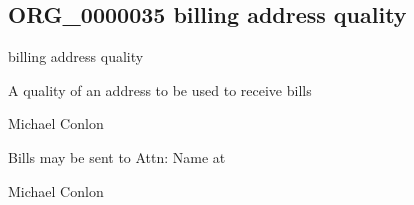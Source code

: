 \documentclass[letterpaper,10pt,english]{sphinxmanual}
\begin{document}
\subsection{ORG\_0000035 \sphinxhyphen{} billing address quality}
\label{\detokenize{doc-ORG_0000035:org-0000035-billing-address-quality}}\label{\detokenize{doc-ORG_0000035:index-0}}\label{\detokenize{doc-ORG_0000035::doc}}
\begin{sphinxShadowBox}

\sphinxAtStartPar
billing address quality
\end{sphinxShadowBox}

\begin{sphinxShadowBox}

\sphinxAtStartPar
{\hyperref[\detokenize{doc-BFO_0000019::doc}]{}}
\end{sphinxShadowBox}

\begin{sphinxShadowBox}

\sphinxAtStartPar
A quality of an address to be used to receive bills
\end{sphinxShadowBox}

\begin{sphinxShadowBox}

\sphinxAtStartPar
Michael Conlon 
\end{sphinxShadowBox}

\begin{sphinxShadowBox}

\sphinxAtStartPar
Bills may be sent to Attn: Name at
\end{sphinxShadowBox}

\begin{sphinxShadowBox}

\sphinxAtStartPar
Michael Conlon 
\end{sphinxShadowBox}
\begin{quote}

\ignorespaces \end{quote}
\end{document}
